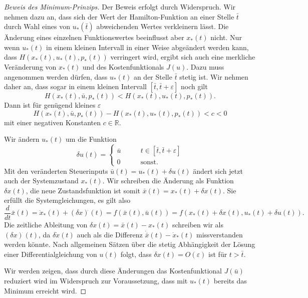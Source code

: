 \begin{proof}[Beweis des Minimum-Prinzips]
Der Beweis erfolgt durch Widerspruch.
Wir nehmen dazu an, dass sich der Wert der Hamilton-Funktion an einer
Stelle $\bar{t}$ durch Wahl eines von $u_*(\bar{t})$ abweichenden Wertes
verkleinern lässt.
Die Änderung eines einzelnen Funktionswertes beeinflusst aber $x_*(t)$ nicht.
Nur wenn $u_*(t)$ in einem kleinen Intervall in einer Weise abgeändert
werden kann, dass $H(x_*(t),u_*(t),p_*(t))$ verringert wird, ergibt sich
auch eine merkliche Veränderung von $x_*(t)$ und des Kostenfunktionals $J(u)$.
Dazu muss angenommen werden dürfen, dass $u_*(t)$ an der Stelle $\bar{t}$
stetig ist.
Wir nehmen daher an, dass sogar in einem kleinen Intervall 
$[\bar{t},\bar{t}+\varepsilon]$ noch gilt
\[
H(x_*(t),\bar{u},p_*(t)) < H(x_*(t), u_*(t), p_*(t)).
\]
Dann ist für genügend kleines $\varepsilon$
\begin{equation}
H(x_*(t),\bar{u},p_*(t)) - H(x_*(t),u_*(t),p_*(t)) < c < 0
\label{buch:hamiltonjacobi:oc:eqn:Hunterschied}
\end{equation}
mit einer negativen Konstanten $c\in\mathbb{R}$.

Wir ändern $u_*(t)$ um die Funktion
\[
\delta u(t)
=
\begin{cases}
\bar{u}&\qquad t\in [\bar{t},\bar{t}+\varepsilon] \\
0      &\qquad\text{sonst}.
\end{cases}
\]
Mit den veränderten Steuerinputs $\bar{u}(t) = u_*(t) + \delta u(t)$ ändert
sich jetzt auch der Systemzustand $x_*(t)$.
Wir schreiben die Änderung als Funktion $\delta x(t)$, die neue
Zustandsfunktion ist somit $\bar{x}(t) = x_*(t)+\delta x(t)$.
Sie erfüllt die Systemgleichungen, es gilt also
\[
\frac{d}{dt}\bar{x}(t)
=
\dot{x}_*(t) + (\delta x)^{\dot{}}(t)
=
f(\bar{x}(t),\bar{u}(t))
=
f(x_*(t)+\delta x(t), u_*(t)+\delta u(t)).
\]
Die zeitliche Ableitung von $\delta x(t)=\bar{x}(t)-x_*(t)$ schreiben wir als
$(\delta x)^{\dot{}}(t)$, da $\delta\dot{x}(t)$ auch als die Differenz
$\dot{\bar{x}}(t)-\dot{x}_*(t)$ missverstanden werden könnte.
Nach allgemeinen Sätzen über die stetig Abhängigkeit der Lösung einer
Differentialgleichung von $u(t)$ folgt, dass
$\delta x(t)=O(\varepsilon)$ ist für $t>\bar{t}$.

Wir werden zeigen, dass durch diese Änderungen das Kostenfunktional
$J(\bar{u})$ reduziert wird im Widerspruch zur Voraussetzung, dass 
mit $u_*(t)$ bereits das Minimum erreicht wird.


\end{proof}
